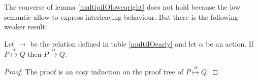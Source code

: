 The converse of lemma \ref{multipiIOloweqright} does not hold because the low semantic allow to express interleaving behaviour. But there is the following weaker result:
\begin{proposition}
  Let $\rightarrow$ be the relation defined in table \ref{multiIOearly} and let $\alpha$ be an action. If $P \stackrel{\alpha}{\longmapsto} Q$ then $P\xrightarrow{\alpha} Q$.
  \begin{proof}
    The proof is an easy induction on the proof tree of $P \stackrel{\alpha}{\longmapsto} Q$.
  \end{proof}
\end{proposition}






